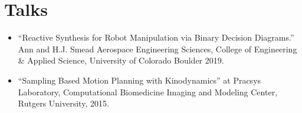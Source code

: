 \documentclass[11pt,a4paper,sans]{moderncv}        %
\begin{document}
\section{Talks}

\vspace{6pt}
 
\begin{itemize}

\item{“Reactive Synthesis for Robot Manipulation via Binary Decision Diagrams.” Ann and H.J. Smead Aerospace Engineering Sciences, College of Engineering \& Applied Science, University of Colorado Boulder 2019.}

\vspace{6pt}

\item{“Sampling Based Motion Planning with Kinodynamics” at Pracsys Laboratory, Computational Biomedicine Imaging and Modeling Center, Rutgers University, 2015.}

\end{itemize}

\nocite{*}



\end{document}
